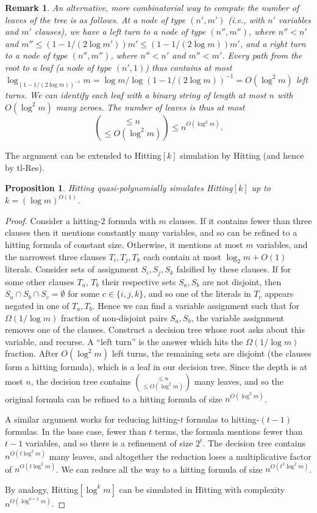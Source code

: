 \documentclass[11pt]{article}
\newcommand{\scterm}[1]{{\textrm{\sc #1}}}
\newcommand{\hit}{\scterm{Hitting}}
\newcommand{\tres}{\scterm{tl-Res}}
\newcommand{\hitk}[1]{\hit$[#1]$}
\numberwithin{equation}{section}
\newtheorem{proposition}[theorem]{Proposition}
\newtheorem{remark}[theorem]{Remark}
\begin{document}
\begin{remark}
An alternative, more combinatorial way to compute the number of leaves of the tree is as follows. 
At a node of type $(n',m')$ (i.e., with $n'$ variables and $m'$ clauses), we have a left turn to a node of type $(n'',m'')$, where $n'' < n'$ and $m'' \leq (1-1/(2\log m')) m' \leq (1-1/(2\log m)) m'$, and a right turn to a node of type $(n'',m'')$, where $n'' < n'$ and $m'' < m'$. Every path from the root to a leaf (a node of type $(n',1)$) thus contains at most $\log_{(1 - 1 / (2\log m))^{-1}} m = \log m / \log (1 - 1 / (2\log m))^{-1} = O(\log^2 m)$ left turns. We can identify each leaf with a binary string of length at most $n$ with $O(\log^2 m)$ many zeroes. The number of leaves is thus at most
\[
 \binom{\leq n}{\leq O(\log^2 m)} \leq n^{O(\log^2 m)}.
\]
\end{remark}
The argument can be extended to {\hitk{k}} simulation by {\hit} (and hence by {\tres}). 
\begin{proposition}\label{prop:hitk-qsim-hit}
    {\hit} quasi-polynomially simulates {\hitk{k}} up to $k=(\log m)^{O(1)}$.
\end{proposition}
\begin{proof}
Consider a hitting-2 formula with $m$ clauses. If it contains fewer than three clauses then it mentions constantly many variables, and so can be refined to a hitting formula of constant size. Otherwise, it mentions at most $m$ variables, and the narrowest three clauses $T_i,T_j,T_k$ each contain at most $\log_2 m + O(1)$ literals. Consider sets of assignment $S_i, S_j, S_k$ falsified by these clauses. If for some other clauses $T_a$, $T_b$ their respective sets $S_a,S_b$ are not disjoint, then $S_a \cap S_b \cap S_c = \emptyset$ for some $c \in \{i,j,k\}$, and so one of the literals in $T_c$ appears negated in one of $T_a,T_b$. Hence we can find a variable assignment such that for $\Omega(1/\log m)$ fraction of non-disjoint pairs $S_a,S_b$, the variable assignment removes one of the clauses. Construct a decision tree whose root asks about this variable, and recurse. A ``left turn'' is the answer which hits the $\Omega(1/\log m)$ fraction. After $O(\log^2 m)$ left turns, the remaining sets are disjoint (the clauses form a hitting formula), which is a leaf in our decision tree. Since the depth is at most $n$, the decision tree contains $\binom{\leq n}{\leq O(\log^2 m)}$ many leaves, and so the original formula can be refined to a hitting formula of size $n^{O(\log^2 m)}$.

A similar argument works for reducing  hitting-$t$ formulas to  hitting-$(t-1)$ formulas. In the base case, fewer than $t$ terms, the formula mentions fewer than $t-1$ variables, and so there is a refinement of size $2^t$. The decision tree contains $n^{O(t\log^2 m)}$ many leaves, and altogether the reduction loses a multiplicative factor of $n^{O(t\log^2 m)}$. We can reduce all the way to a hitting formula of size $n^{O(t^2\log^2 m)}$.

{By analogy, {{\hitk{{\log^km}}}} can be simulated in {\hit} with complexity $n^{O(\log^{k+2}m)}$.}
\end{proof}
\end{document}
